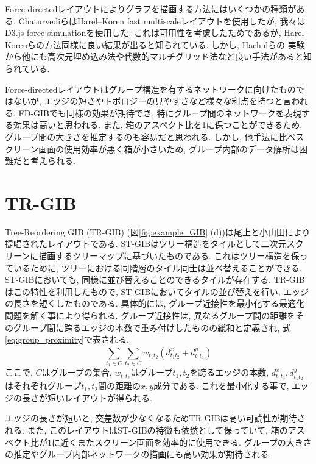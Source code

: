 \documentclass{kuee}
\begin{document}
Force-directedレイアウトによりグラフを描画する方法にはいくつかの種類がある.
ChaturvediらはHarel--Koren fast multiscaleレイアウト\cite{harel2002graph}を使用したが, 我々はD3.js force simulation\cite{Bostock:2011:DDD:2068462.2068631}を使用した.
これは可用性を考慮したためであるが, Harel--Korenらの方法同様に良い結果が出ると知られている.
しかし, Hachulらの
実験\cite{Hachul:2005:ECF:2102325.2102348}から他にも高次元埋め込み法\cite{harel2002graph}や代数的マルチグリッド法\cite{koren2003drawing}など良い手法があると知られている.

Force-directedレイアウトはグループ構造を有するネットワークに向けたものではないが, エッジの短さやトポロジーの見やすさなど様々な利点を持つと言われる\cite{Kobourov2013ForceDirectedDA}.
FD-GIBでも同様の効果が期待でき, 特にグループ間のネットワークを表現する効果は高いと思われる.
また, 箱のアスペクト比を1に保つことができるため, グループ間の大きさを推定するのも容易だと思われる.
しかし, 他手法に比べスクリーン画面の使用効率が悪く箱が小さいため, グループ内部のデータ解析は困難だと考えられる.

\section{TR-GIB}
Tree-Reordering GIB (TR-GIB) (図\ref{fig:example_GIB} (d))は尾上と小山田により提唱されたレイアウトである.
ST-GIBはツリー構造をタイルとして二次元スクリーンに描画するツリーマップに基づいたものである.
これはツリー構造を保っているために, ツリーにおける同階層のタイル同士は並べ替えることができる.
ST-GIBにおいても, 同様に並び替えることのできるタイルが存在する.
TR-GIBはこの特性を利用したもので, ST-GIBにおいてタイルの並び替えを行い, エッジの長さを短くしたものである.
具体的には, グループ近接性を最小化する最適化問題を解く事により得られる.
グループ近接性は, 異なるグループ間の距離をそのグループ間に跨るエッジの本数で重み付けしたものの総和と定義され, 式\ref{eq:group_proximity}で表される.
\begin{equation}
\label{eq:group_proximity}
  \sum_{t_1 \in C}^{} \sum_{t_2 \in C}^{} w_{t_1 t_2}(d_{t_1 t_2}^x + d_{t_1 t_2}^y)
\end{equation}
ここで, $C$はグループの集合, $w_{t_1 t_2}$はグループ$t_1, t_2$を跨るエッジの本数, $d_{t_1 t_2}^x, d_{t_1 t_2}^y$はそれぞれグループ$t_1, t_2$間の距離の$x, y$成分である.
これを最小化する事で, エッジの長さが短いレイアウトが得られる.

エッジの長さが短いと, 交差数が少なくなるためTR-GIBは高い可読性が期待される.
また, このレイアウトはST-GIBの特徴も依然として保っていて, 箱のアスペクト比が1に近くまたスクリーン画面を効率的に使用できる.
グループの大きさの推定やグループ内部ネットワークの描画にも高い効果が期待される.
\end{document}
